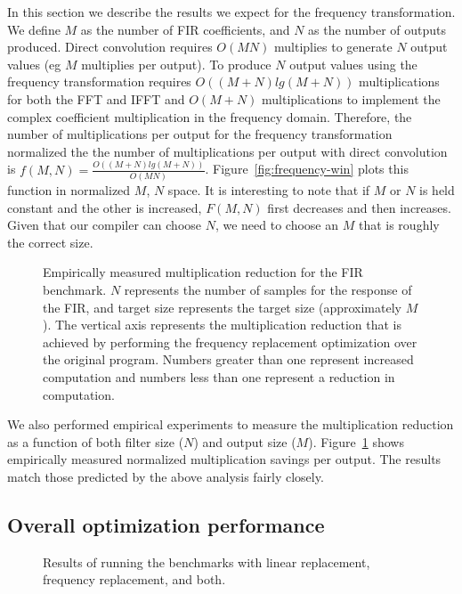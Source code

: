 In this section we describe the results we expect for the frequency transformation. We
define $M$ as the number of FIR coefficients, and $N$ as the number of outputs produced. Direct 
convolution requires $O(MN)$ multiplies to generate $N$ output values 
(eg $M$ multiplies per output). To produce $N$ output values using the frequency transformation 
requires $O((M+N)lg(M+N))$ multiplications for both the FFT and IFFT and $O(M+N)$ 
multiplications to implement the complex coefficient multiplication in the frequency domain.
Therefore, the number of multiplications per output for the frequency transformation
normalized the the number of multiplications per output with direct convolution is
$f(M,N)=\frac{O((M+N)lg(M+N))}{O(MN)}$. Figure~\ref{fig:frequency-win} plots this function
in normalized $M$, $N$ space. It is interesting to note that if $M$ or $N$ is held constant 
and the other is increased, $F(M,N)$ first decreases and then increases. Given that our compiler
can choose $N$, we need to choose an $M$ that is roughly the correct size.

\begin{figure}
\center
\epsfxsize=3.0in
\caption{Empirically measured multiplication reduction for the FIR benchmark. $N$ represents the number of samples for the response of the FIR, and target size represents the target size (approximately $M$). The vertical axis represents the multiplication reduction that is achieved by performing the frequency replacement optimization over the original program. Numbers greater than one represent increased computation and numbers less than one represent a reduction in computation. }
\label{fig:frequency-win-empirical}
\end{figure}


We also performed empirical experiments to measure the multiplication reduction
as a function of both filter size ($N$) and output size ($M$). 
Figure~\ref{fig:frequency-win-empirical} shows empirically measured normalized 
multiplication savings per output. The results match those predicted by the 
above analysis fairly closely.


\subsection{Overall optimization performance}

\begin{figure}
\center
\epsfxsize=3.0in
\caption{Results of running the benchmarks with linear replacement, frequency replacement, and both.}
\label{fig:linear-freq-both}
\end{figure}

